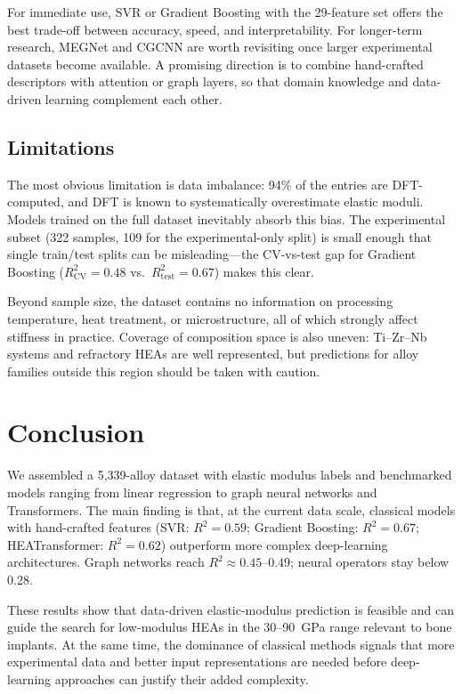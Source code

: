 \documentclass[11pt,a4paper]{article}
\begin{document}
For immediate use, SVR or Gradient Boosting with the 29-feature set offers the best trade-off between accuracy, speed, and interpretability.  For longer-term research, MEGNet and CGCNN are worth revisiting once larger experimental datasets become available.  A promising direction is to combine hand-crafted descriptors with attention or graph layers, so that domain knowledge and data-driven learning complement each other.

\subsection{Limitations}

The most obvious limitation is data imbalance: 94\% of the entries are DFT-computed, and DFT is known to systematically overestimate elastic moduli.  Models trained on the full dataset inevitably absorb this bias.  The experimental subset (322 samples, 109 for the experimental-only split) is small enough that single train/test splits can be misleading---the CV-vs-test gap for Gradient Boosting ($R^2_\text{CV}=0.48$ vs.\ $R^2_\text{test}=0.67$) makes this clear.

Beyond sample size, the dataset contains no information on processing temperature, heat treatment, or microstructure, all of which strongly affect stiffness in practice.  Coverage of composition space is also uneven: Ti--Zr--Nb systems and refractory HEAs are well represented, but predictions for alloy families outside this region should be taken with caution.

\section{Conclusion}

We assembled a 5{,}339-alloy dataset with elastic modulus labels and benchmarked models ranging from linear regression to graph neural networks and Transformers.  The main finding is that, at the current data scale, classical models with hand-crafted features (SVR: $R^2=0.59$; Gradient Boosting: $R^2=0.67$; HEATransformer: $R^2=0.62$) outperform more complex deep-learning architectures.  Graph networks reach $R^2 \approx 0.45$--$0.49$; neural operators stay below 0.28.

These results show that data-driven elastic-modulus prediction is feasible and can guide the search for low-modulus HEAs in the 30--90~GPa range relevant to bone implants.  At the same time, the dominance of classical methods signals that more experimental data and better input representations are needed before deep-learning approaches can justify their added complexity.
\end{document}
